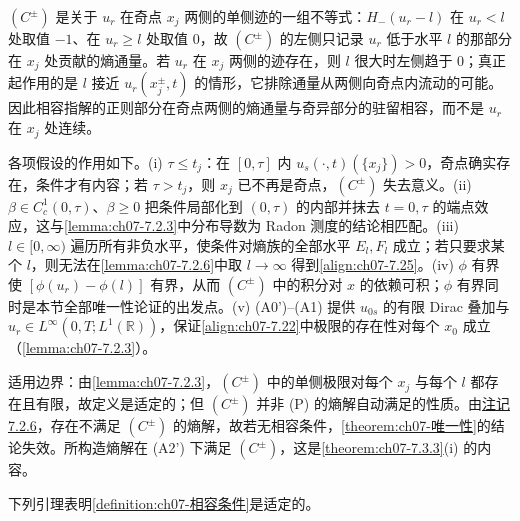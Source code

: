 \documentclass[../../main.tex]{subfiles}%
\begin{document}
\begin{remark}\label{remark:ch07-相容条件动机}
$(C^\pm)$ 是关于 $u_r$ 在奇点 $x_j$ 两侧的单侧迹的一组不等式：$H_-(u_r-l)$ 在 $u_r<l$ 处取值 $-1$、在 $u_r\geqslant l$ 处取值 $0$，故 $(C^\pm)$ 的左侧只记录 $u_r$ 低于水平 $l$ 的那部分在 $x_j$ 处贡献的熵通量。若 $u_r$ 在 $x_j$ 两侧的迹存在，则 $l$ 很大时左侧趋于 $0$；真正起作用的是 $l$ 接近 $u_r(x_j^\pm,t)$ 的情形，它排除通量从两侧向奇点内流动的可能。因此相容指解的正则部分在奇点两侧的熵通量与奇异部分的驻留相容，而不是 $u_r$ 在 $x_j$ 处连续。

各项假设的作用如下。(i) $\tau\leqslant t_j$：在 $[0,\tau]$ 内 $u_s(\cdot,t)(\{x_j\})>0$，奇点确实存在，条件才有内容；若 $\tau>t_j$，则 $x_j$ 已不再是奇点，$(C^\pm)$ 失去意义。(ii) $\beta\in C^1_c(0,\tau)$、$\beta\geqslant0$ 把条件局部化到 $(0,\tau)$ 的内部并抹去 $t=0,\tau$ 的端点效应，这与\cref{lemma:ch07-7.2.3}中分布导数为 Radon 测度的结论相匹配。(iii) $l\in[0,\infty)$ 遍历所有非负水平，使条件对熵族的全部水平 $E_l,F_l$ 成立；若只要求某个 $l$，则无法在\cref{lemma:ch07-7.2.6}中取 $l\to\infty$ 得到\eqref{align:ch07-7.25}。(iv) $\phi$ 有界使 $[\phi(u_r)-\phi(l)]$ 有界，从而 $(C^\pm)$ 中的积分对 $x$ 的依赖可积；$\phi$ 有界同时是本节全部唯一性论证的出发点。(v) (A0')--(A1) 提供 $u_{0s}$ 的有限 Dirac 叠加与 $u_r\in L^\infty(0,T;L^1(\mathbb{R}))$，保证\eqref{align:ch07-7.22}中极限的存在性对每个 $x_0$ 成立（\cref{lemma:ch07-7.2.3}）。

适用边界：由\cref{lemma:ch07-7.2.3}，$(C^\pm)$ 中的单侧极限对每个 $x_j$ 与每个 $l$ 都存在且有限，故定义是适定的；但 $(C^\pm)$ 并非 (P) 的熵解自动满足的性质。由\hyperref[remark:ch07-7.2.6]{注记 7.2.6}，存在不满足 $(C^\pm)$ 的熵解，故若无相容条件，\cref{theorem:ch07-唯一性}的结论失效。所构造熵解在 (A2') 下满足 $(C^\pm)$，这是\cref{theorem:ch07-7.3.3}(i) 的内容。
\end{remark}

下列引理表明\cref{definition:ch07-相容条件}是适定的。
\end{document}

